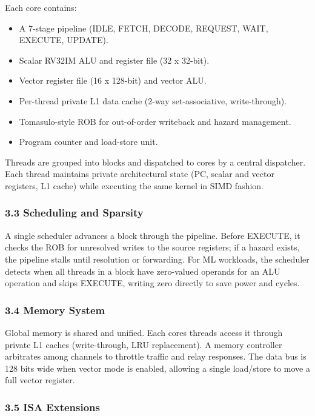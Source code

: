 Each core contains:

\begin{itemize}
\tightlist
\item
  A 7-stage pipeline (IDLE, FETCH, DECODE, REQUEST, WAIT, EXECUTE,
  UPDATE).
\item
  Scalar RV32IM ALU and register file (32 x 32-bit).
\item
  Vector register file (16 x 128-bit) and vector ALU.
\item
  Per-thread private L1 data cache (2-way set-associative,
  write-through).
\item
  Tomasulo-style ROB for out-of-order writeback and hazard management.
\item
  Program counter and load-store unit.
\end{itemize}

Threads are grouped into blocks and dispatched to cores by a central
dispatcher. Each thread maintains private architectural state (PC,
scalar and vector registers, L1 cache) while executing the same kernel
in SIMD fashion.

\subsubsection{3.3 Scheduling and
Sparsity}\label{33-scheduling-and-sparsity}

A single scheduler advances a block through the pipeline. Before
EXECUTE, it checks the ROB for unresolved writes to the source
registers; if a hazard exists, the pipeline stalls until resolution or
forwarding. For ML workloads, the scheduler detects when all threads in
a block have zero-valued operands for an ALU operation and skips
EXECUTE, writing zero directly to save power and cycles.

\subsubsection{3.4 Memory System}\label{34-memory-system}

Global memory is shared and unified. Each core\textquotesingle s threads
access it through private L1 caches (write-through, LRU replacement). A
memory controller arbitrates among channels to throttle traffic and
relay responses. The data bus is 128 bits wide when vector mode is
enabled, allowing a single load/store to move a full vector register.

\subsubsection{3.5 ISA Extensions}\label{35-isa-extensions}

